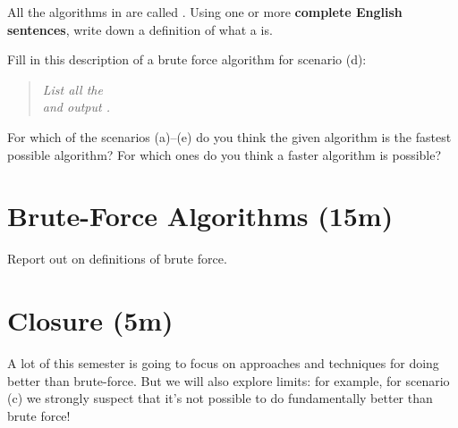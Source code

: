 \documentclass{tufte-handout}
\begin{document}
\begin{questions}
  \newpage
  \item All the algorithms in  are called
    .  Using one or more \textbf{complete
      English sentences}, write down a definition of what a
     is.

  \item \label{q:gcd-brute} Fill in this description of a brute force
    algorithm for scenario (d): \vspace{0.3in}

    \begin{fullwidth}
    \begin{quote}
      \emph{List all the \uline{\hfill} \\[2em] and output
        \uline{\hfill}.}
    \end{quote}
    \end{fullwidth}
  \item For which of the scenarios (a)--(e) do you think the given
    algorithm is the fastest possible algorithm?  For which ones do
    you think a faster algorithm is possible?
\end{questions}

\newpage

\section{Brute-Force Algorithms (15m)}

Report out on definitions of brute force.

\section{Closure (5m)}

A lot of this semester is going to focus on approaches and techniques
for doing better than brute-force.  But we will also explore limits:
for example, for scenario (c) we strongly suspect that it's not
possible to do fundamentally better than brute force!
\end{document}
